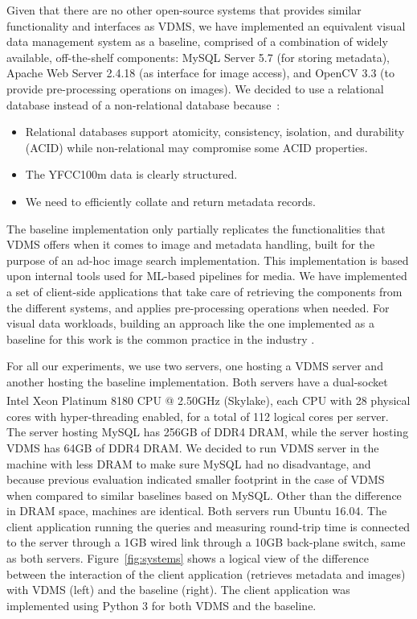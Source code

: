 Given that there are no other open-source systems
that provides similar functionality and interfaces as VDMS,
we have implemented an equivalent visual data management system as a baseline,
comprised of a combination of widely available, off-the-shelf components:
MySQL Server 5.7 (for storing metadata),
Apache Web Server 2.4.18 (as interface for image access), and
OpenCV 3.3 (to provide pre-processing operations on images).
We decided to use a relational database instead of a non-relational
database because~\cite{Jatana2012, li_2019}:
\begin{itemize}
    \item Relational databases support atomicity, consistency, isolation,
    and durability (ACID) while non-relational may compromise some ACID properties.
    \item The YFCC100m data is clearly structured.
    \item We need to efficiently collate and return metadata records.
\end{itemize}
The baseline implementation only partially replicates the functionalities
that VDMS offers when it comes to image and metadata handling, built for the
purpose of an ad-hoc image search implementation.
This implementation is based upon internal tools used for
ML-based pipelines for media.
We have implemented a set of client-side applications that take care
of retrieving the components from the different systems, and applies
pre-processing operations when needed.
For visual data workloads, building an approach like the one
implemented as a baseline for this work
is the common practice in the industry \cite{haystack, tao}.

For all our experiments, we use two servers, one hosting a VDMS server and
another hosting the baseline implementation.
Both servers have a dual-socket Intel\textsuperscript{\textregistered}
Xeon\textsuperscript{\textregistered} Platinum 8180 CPU @ 2.50GHz (Skylake),
each CPU with 28 physical cores with hyper-threading enabled,
for a total of 112 logical cores per server.
The server hosting MySQL has 256GB of DDR4 DRAM, while the server hosting VDMS
has 64GB of DDR4 DRAM.
We decided to run VDMS server in the machine with less DRAM to make
sure MySQL had no disadvantage, and because previous evaluation
indicated smaller footprint in the case of VDMS when
compared to similar baselines based on MySQL.
Other than the difference in DRAM space, machines are identical.
Both servers run Ubuntu 16.04.
The client application running the queries and measuring round-trip time
is connected to the server through a 1GB wired link through
a 10GB back-plane switch, same as both servers.
Figure~\ref{fig:systems} shows a logical view of the difference between the
interaction of the client application (retrieves metadata and
images) with VDMS (left) and the baseline (right).
The client application was implemented using Python 3 for both VDMS and
the baseline.

